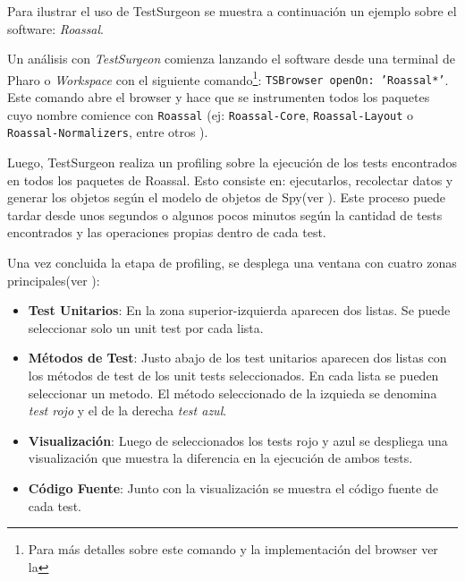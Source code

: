 \par Para ilustrar el uso de TestSurgeon se muestra a continuación un ejemplo sobre el software: \emph{Roassal}.

\par Un análisis con \emph{TestSurgeon} comienza lanzando el software desde una terminal de Pharo o \emph{Workspace} con el siguiente comando\footnote{Para más detalles sobre este comando y la implementación del browser ver la  }: {\tt TSBrowser openOn: 'Roassal*'}. Este comando abre el browser y hace que se instrumenten todos los paquetes cuyo nombre comience con {\tt Roassal} (ej: {\tt Roassal-Core}, {\tt Roassal-Layout} o {\tt Roassal-Normalizers}, entre otros ).


\par Luego, TestSurgeon realiza un profiling sobre la ejecución de los tests encontrados en todos los paquetes de Roassal. Esto consiste en: ejecutarlos, recolectar datos y generar los objetos según el modelo de objetos de Spy(ver ). Este proceso puede tardar desde unos segundos o algunos pocos minutos según la cantidad de tests encontrados y las operaciones propias dentro de cada test.

\par Una vez concluida la etapa de profiling, se desplega una ventana con cuatro zonas principales(ver ): 
\begin{itemize}
\item {\bf Test Unitarios}: En la zona superior-izquierda aparecen dos listas. Se puede seleccionar solo un unit test por cada lista.
\item {\bf Métodos de Test}: Justo abajo de los test unitarios aparecen dos listas con los métodos de test de los unit tests seleccionados. En cada lista se pueden seleccionar un metodo. El método seleccionado de la izquieda se denomina \emph{test rojo} y el de la derecha \emph{test azul}.
\item {\bf Visualización}: Luego de seleccionados los tests rojo y azul se despliega una visualización que muestra la diferencia en la ejecución de ambos tests.
\item {\bf Código Fuente}: Junto con la visualización se muestra el código fuente de cada test.
\end{itemize}



